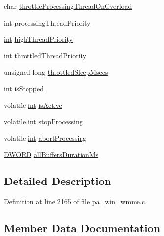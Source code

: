 \begin{DoxyCompactItemize}
\item 
char \hyperlink{struct_pa_win_mme_stream_aa8a3358086a7b8f651d60b0d985e67b1}{throttle\+Processing\+Thread\+On\+Overload}
\item 
\hyperlink{xmltok_8h_a5a0d4a5641ce434f1d23533f2b2e6653}{int} \hyperlink{struct_pa_win_mme_stream_a311881b80202a1e0e34f1843cef38f80}{processing\+Thread\+Priority}
\item 
\hyperlink{xmltok_8h_a5a0d4a5641ce434f1d23533f2b2e6653}{int} \hyperlink{struct_pa_win_mme_stream_a1aa8a6665f6bddaa562bc80c40239659}{high\+Thread\+Priority}
\item 
\hyperlink{xmltok_8h_a5a0d4a5641ce434f1d23533f2b2e6653}{int} \hyperlink{struct_pa_win_mme_stream_a378da5fecc2e6243bb9e2734a7abbc55}{throttled\+Thread\+Priority}
\item 
unsigned long \hyperlink{struct_pa_win_mme_stream_afeec18b626234331c453eaf4088c8b89}{throttled\+Sleep\+Msecs}
\item 
\hyperlink{xmltok_8h_a5a0d4a5641ce434f1d23533f2b2e6653}{int} \hyperlink{struct_pa_win_mme_stream_a3115c68b4187cb75976b7d4b43969005}{is\+Stopped}
\item 
volatile \hyperlink{xmltok_8h_a5a0d4a5641ce434f1d23533f2b2e6653}{int} \hyperlink{struct_pa_win_mme_stream_af307a61ff6b0f640d97a74559a0784e9}{is\+Active}
\item 
volatile \hyperlink{xmltok_8h_a5a0d4a5641ce434f1d23533f2b2e6653}{int} \hyperlink{struct_pa_win_mme_stream_afacda8f3c812a5d0aa6aca46e88863b1}{stop\+Processing}
\item 
volatile \hyperlink{xmltok_8h_a5a0d4a5641ce434f1d23533f2b2e6653}{int} \hyperlink{struct_pa_win_mme_stream_ad25340e1c534df357baa32734cc30e36}{abort\+Processing}
\item 
\hyperlink{mapinls_8h_ad342ac907eb044443153a22f964bf0af}{D\+W\+O\+RD} \hyperlink{struct_pa_win_mme_stream_ab11b55925f764c163143ac2ff31a9cc4}{all\+Buffers\+Duration\+Ms}
\end{DoxyCompactItemize}


\subsection{Detailed Description}


Definition at line 2165 of file pa\+\_\+win\+\_\+wmme.\+c.



\subsection{Member Data Documentation}

